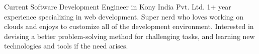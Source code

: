 

\begin{resumeSummary}

Current Software Development Engineer in Kony India Pvt. Ltd. 1+ year experience specializing in web development. Super nerd who loves working on clouds and enjoys to customize all of the development environment. Interested in devising a better problem-solving method for challenging tasks, and learning new technologies and tools if the need arises.
\end{resumeSummary}
